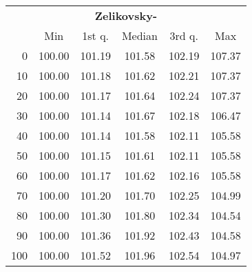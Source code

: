 \begin{tabular}{r|ccccc}
  \multicolumn{6}{c}{{\bf Zelikovsky-}} \\
  & Min & 1st q. & Median & 3rd q. & Max \\ \hline\hline
  0 & 100.00 & 101.19 & 101.58 & 102.19 & 107.37
\\ 10 & 100.00 & 101.18 & 101.62 & 102.21 & 107.37
\\ 20 & 100.00 & 101.17 & 101.64 & 102.24 & 107.37
\\ 30 & 100.00 & 101.14 & 101.67 & 102.18 & 106.47
\\ 40 & 100.00 & 101.14 & 101.58 & 102.11 & 105.58
\\ 50 & 100.00 & 101.15 & 101.61 & 102.11 & 105.58
\\ 60 & 100.00 & 101.17 & 101.62 & 102.16 & 105.58
\\ 70 & 100.00 & 101.20 & 101.70 & 102.25 & 104.99
\\ 80 & 100.00 & 101.30 & 101.80 & 102.34 & 104.54
\\ 90 & 100.00 & 101.36 & 101.92 & 102.43 & 104.58
\\ 100 & 100.00 & 101.52 & 101.96 & 102.54 & 104.97
\end{tabular}
